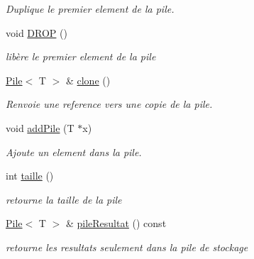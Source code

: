 \begin{DoxyCompactItemize}
\begin{DoxyCompactList}\small\item\em Duplique le premier element de la pile. \item\end{DoxyCompactList}\item 
\hypertarget{classPile_ab3bff8336491d068c21958939737571f}{
void \hyperlink{classPile_ab3bff8336491d068c21958939737571f}{DROP} ()}
\label{classPile_ab3bff8336491d068c21958939737571f}

\begin{DoxyCompactList}\small\item\em libère le premier element de la pile \item\end{DoxyCompactList}\item 
\hypertarget{classPile_a0615cbdce400a7aea271de2193e46fe4}{
\hyperlink{classPile}{Pile}$<$ T $>$ \& \hyperlink{classPile_a0615cbdce400a7aea271de2193e46fe4}{clone} ()}
\label{classPile_a0615cbdce400a7aea271de2193e46fe4}

\begin{DoxyCompactList}\small\item\em Renvoie une reference vers une copie de la pile. \item\end{DoxyCompactList}\item 
void \hyperlink{classPile_a5e80dbc7bc37bb4cc6439a2299bb2327}{addPile} (T $\ast$x)
\begin{DoxyCompactList}\small\item\em Ajoute un element dans la pile. \item\end{DoxyCompactList}\item 
\hypertarget{classPile_a3e8bd308a162809611df5e2872946820}{
int \hyperlink{classPile_a3e8bd308a162809611df5e2872946820}{taille} ()}
\label{classPile_a3e8bd308a162809611df5e2872946820}

\begin{DoxyCompactList}\small\item\em retourne la taille de la pile \item\end{DoxyCompactList}\item 
\hypertarget{classPile_ac3e83355eb3e97f68e1a91e90ee09123}{
\hyperlink{classPile}{Pile}$<$ T $>$ \& \hyperlink{classPile_ac3e83355eb3e97f68e1a91e90ee09123}{pileResultat} () const }
\label{classPile_ac3e83355eb3e97f68e1a91e90ee09123}

\begin{DoxyCompactList}\small\item\em retourne les resultats seulement dans la pile de stockage \item\end{DoxyCompactList}\end{DoxyCompactItemize}


